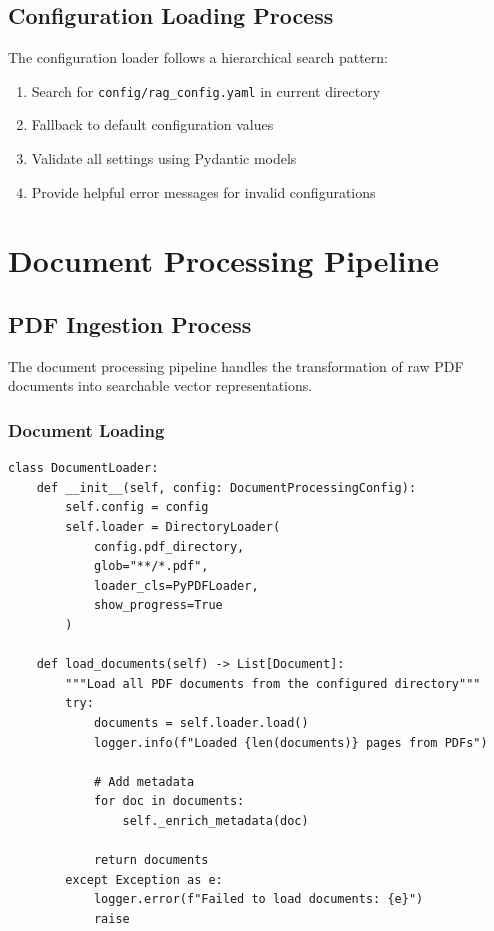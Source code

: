 \documentclass[12pt,a4paper]{article}
\begin{document}
\subsection{Configuration Loading Process}

The configuration loader follows a hierarchical search pattern:

\begin{enumerate}
    \item Search for \texttt{config/rag\_config.yaml} in current directory
    \item Fallback to default configuration values
    \item Validate all settings using Pydantic models
    \item Provide helpful error messages for invalid configurations
\end{enumerate}

\section{Document Processing Pipeline}

\subsection{PDF Ingestion Process}

The document processing pipeline handles the transformation of raw PDF documents into searchable vector representations.

\subsubsection{Document Loading}

\begin{lstlisting}[caption=Document Loader Implementation]
class DocumentLoader:
    def __init__(self, config: DocumentProcessingConfig):
        self.config = config
        self.loader = DirectoryLoader(
            config.pdf_directory,
            glob="**/*.pdf",
            loader_cls=PyPDFLoader,
            show_progress=True
        )
    
    def load_documents(self) -> List[Document]:
        """Load all PDF documents from the configured directory"""
        try:
            documents = self.loader.load()
            logger.info(f"Loaded {len(documents)} pages from PDFs")
            
            # Add metadata
            for doc in documents:
                self._enrich_metadata(doc)
                
            return documents
        except Exception as e:
            logger.error(f"Failed to load documents: {e}")
            raise
\end{lstlisting}
\end{document}
